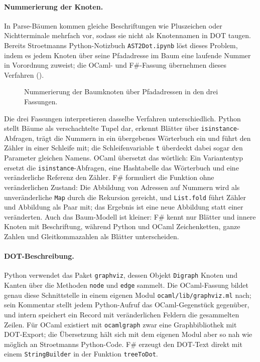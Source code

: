 \paragraph{Nummerierung der Knoten.}
In Parse-Bäumen kommen gleiche Beschriftungen wie Pluszeichen oder Nichtterminale mehrfach vor, sodass sie nicht als Knotennamen in DOT taugen.
Bereits Stroetmanns Python-Notizbuch \texttt{AST2Dot.ipynb} löst dieses Problem, indem es jedem Knoten über seine Pfadadresse im Baum eine laufende Nummer in Vorordnung zuweist; die OCaml- und F\#-Fassung übernehmen dieses Verfahren ().

\begin{figure}[htbp]



\caption{Nummerierung der Baumknoten über Pfadadressen in den drei Fassungen.}
\label{fig:assign_numbers}
\end{figure}

Die drei Fassungen interpretieren dasselbe Verfahren unterschiedlich.
Python stellt Bäume als verschachtelte Tupel dar, erkennt Blätter über \texttt{isinstance}-Abfragen, trägt die Nummern in ein übergebenes Wörterbuch ein und führt den Zähler in einer Schleife mit; die Schleifenvariable \texttt{t} überdeckt dabei sogar den Parameter gleichen Namens.
OCaml übersetzt das wörtlich: Ein Variantentyp ersetzt die \texttt{isinstance}-Abfragen, eine Hashtabelle das Wörterbuch und eine veränderliche Referenz den Zähler.
F\# formuliert die Funktion ohne veränderlichen Zustand: Die Abbildung von Adressen auf Nummern wird als unveränderliche \texttt{Map} durch die Rekursion gereicht, und \texttt{List.fold} führt Zähler und Abbildung als Paar mit; das Ergebnis ist eine neue Abbildung statt einer veränderten.
Auch das Baum-Modell ist kleiner: F\# kennt nur Blätter und innere Knoten mit Beschriftung, während Python und OCaml Zeichenketten, ganze Zahlen und Gleitkommazahlen als Blätter unterscheiden.

\paragraph{DOT-Beschreibung.}
Python verwendet das Paket \texttt{graphviz}, dessen Objekt \texttt{Digraph} Knoten und Kanten über die Methoden \texttt{node} und \texttt{edge} sammelt.
Die OCaml-Fassung bildet genau diese Schnittstelle in einem eigenen Modul \texttt{ocaml/lib/graphviz.ml} nach; sein Kommentar stellt jedem Python-Aufruf das OCaml-Gegenstück gegenüber, und intern speichert ein Record mit veränderlichen Feldern die gesammelten Zeilen.
Für OCaml existiert mit \texttt{ocamlgraph} zwar eine Graphbibliothek mit DOT-Export; die Übersetzung hält sich mit dem eigenen Modul aber so nah wie möglich an Stroetmanns Python-Code.
F\# erzeugt den DOT-Text direkt mit einem \texttt{StringBuilder} in der Funktion \texttt{treeToDot}.

